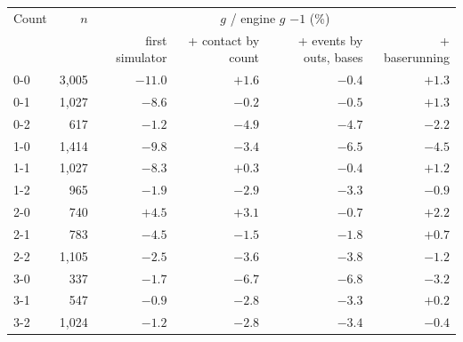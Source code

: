 \begin{tabular}{lrrrrr}
\toprule
Count & $n$ & \multicolumn{4}{c}{$g$ / engine $g$ $-1$ (\%)} \\
 & & first simulator & + contact by count & + events by outs, bases & + baserunning \\
\midrule
0-0 & 3{,}005 & $-11.0$ & $+1.6$ & $-0.4$ & $+1.3$ \\
0-1 & 1{,}027 & $-8.6$ & $-0.2$ & $-0.5$ & $+1.3$ \\
0-2 & 617 & $-1.2$ & $-4.9$ & $-4.7$ & $-2.2$ \\
1-0 & 1{,}414 & $-9.8$ & $-3.4$ & $-6.5$ & $-4.5$ \\
1-1 & 1{,}027 & $-8.3$ & $+0.3$ & $-0.4$ & $+1.2$ \\
1-2 & 965 & $-1.9$ & $-2.9$ & $-3.3$ & $-0.9$ \\
2-0 & 740 & $+4.5$ & $+3.1$ & $-0.7$ & $+2.2$ \\
2-1 & 783 & $-4.5$ & $-1.5$ & $-1.8$ & $+0.7$ \\
2-2 & 1{,}105 & $-2.5$ & $-3.6$ & $-3.8$ & $-1.2$ \\
3-0 & 337 & $-1.7$ & $-6.7$ & $-6.8$ & $-3.2$ \\
3-1 & 547 & $-0.9$ & $-2.8$ & $-3.3$ & $+0.2$ \\
3-2 & 1{,}024 & $-1.2$ & $-2.8$ & $-3.4$ & $-0.4$ \\
\bottomrule
\end{tabular}
